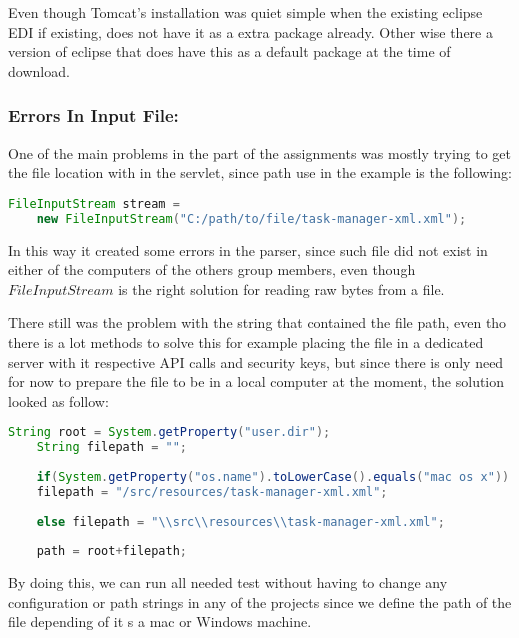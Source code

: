 Even though Tomcat's installation was quiet simple when the existing eclipse EDI if existing, does not have it as a extra package already. Other wise there a version of eclipse that does have this as a default package at the time of download.

\subsubsection*{Errors In Input File:}

One of the main problems in the part of the assignments was mostly trying to get the file location with in the servlet, since path use in the example is the following:

\begin{lstlisting}[language=java]
	FileInputStream stream = 
	new FileInputStream("C:/path/to/file/task-manager-xml.xml");
\end{lstlisting}

In this way it created some errors in the parser, since such file did not exist in either of the computers of the others group members, even though $FileInputStream$ is the right solution for reading raw bytes from a file.

There still was the problem with the string that contained the file path, even tho there is a lot methods to solve this for example placing the file in a dedicated server with it respective API calls and security keys, but since there is only need for now to prepare the file to be in a local computer at the moment, the solution looked as follow:

\begin{lstlisting}[language=java]
	String root = System.getProperty("user.dir");
    String filepath = "";
            
    if(System.getProperty("os.name").toLowerCase().equals("mac os x")) 
	filepath = "/src/resources/task-manager-xml.xml";
    
	else filepath = "\\src\\resources\\task-manager-xml.xml"; 
            
    path = root+filepath;
\end{lstlisting}
 
By doing this, we can run all needed test without having to change any configuration or path strings in any of the projects since we define the path of the file depending of it s a mac or Windows machine.

